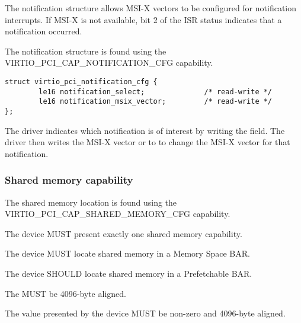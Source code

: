 The notification structure allows MSI-X vectors to be configured for
notification interrupts.  If MSI-X is not available, bit 2 of the ISR status
indicates that a notification occurred.

The notification structure is found using the VIRTIO_PCI_CAP_NOTIFICATION_CFG
capability.

\begin{lstlisting}
struct virtio_pci_notification_cfg {
        le16 notification_select;              /* read-write */
        le16 notification_msix_vector;         /* read-write */
};
\end{lstlisting}

The driver indicates which notification is of interest by writing the
 field.  The driver then writes the MSI-X vector or
 to  to change the
MSI-X vector for that notification.

\subsubsection{Shared memory capability}\label{sec:Device Types / Vhost-user Device Backend / Additional Device Resources over PCI / Shared Memory capability}

The shared memory location is found using the VIRTIO_PCI_CAP_SHARED_MEMORY_CFG
capability.

The device MUST present exactly one shared memory capability.

The device MUST locate shared memory in a Memory Space BAR.

The device SHOULD locate shared memory in a Prefetchable BAR.

The  MUST be 4096-byte aligned.

The value  presented by the device MUST be non-zero and 4096-byte aligned.
